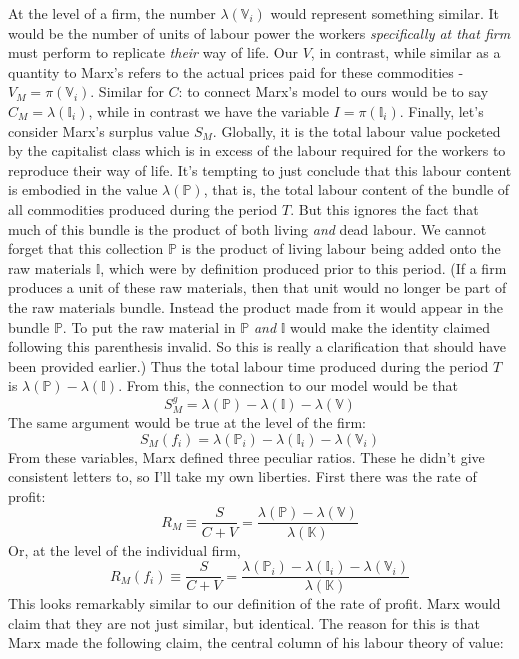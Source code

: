 \documentclass{article}
\theoremstyle{definition}
\theoremstyle{plain}
\theoremstyle{theorem}
\begin{document}
At the level of a firm, the number $\lambda(\mathbb{V}_i)$ would represent something similar. It would be the number of units of labour power the workers \textit{specifically at that firm} must perform to replicate \textit{their} way of life. Our $V$, in contrast, while similar as a quantity to Marx's refers to the actual prices paid for these commodities - $V_M = \pi(\mathbb{V}_i)$. Similar for $C$: to connect Marx's model to ours would be to say $C_M = \lambda(\mathbb{I}_i)$, while in contrast we have the variable $I = \pi(\mathbb{I}_i)$. Finally, let's consider Marx's surplus value $S_M$. Globally, it is the total labour value pocketed by the capitalist class which is in excess of the labour required for the workers to reproduce their way of life. It's tempting to just conclude that this labour content is embodied in the value $\lambda(\mathbb{P})$, that is, the total labour content of the bundle of all commodities produced during the period $T$. But this ignores the fact that much of this bundle is the product of both living \textit{and} dead labour. We cannot forget that this collection $\mathbb{P}$ is the product of living labour being added onto the raw materials $\mathbb{I}$, which were by definition produced prior to this period. (If a firm produces a unit of these raw materials, then that unit would no longer be part of the raw materials bundle. Instead the product made from it would appear in the bundle $\mathbb{P}$. To put the raw material in $\mathbb{P}$ \textit{and} $\mathbb{I}$ would make the identity claimed following this parenthesis invalid. So this is really a clarification that should have been provided earlier.) Thus the total labour time produced during the period $T$ is $\lambda(\mathbb{P})-\lambda(\mathbb{I})$. From this, the connection to our model would be that 
\[ S_M^g = \lambda(\mathbb{P})- \lambda(\mathbb{I}) - \lambda(\mathbb{V}) \]
The same argument would be true at the level of the firm: 
\[S_M(f_i) = \lambda(\mathbb{P}_i)- \lambda(\mathbb{I}_i) - \lambda(\mathbb{V}_i) \]
From these variables, Marx defined three peculiar ratios. These he didn't give consistent letters to, so I'll take my own liberties. First there was the rate of profit:
\[ R_M \equiv \frac{S}{C+V} = \frac{\lambda(\mathbb{P})-\lambda(\mathbb{V})}{\lambda(\mathbb{K})} \]
Or, at the level of the individual firm,
\[ R_M(f_i) \equiv \frac{S}{C+V} = \frac{\lambda(\mathbb{P}_i)-\lambda(\mathbb{I}_i) - \lambda(\mathbb{V}_i)}{\lambda(\mathbb{K})} \]
This looks remarkably similar to our definition of the rate of profit. Marx would claim that they are not just similar, but identical. The reason for this is that Marx made the following claim, the central column of his labour theory of value:
\end{document}
